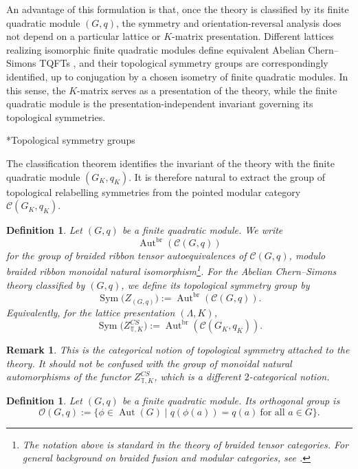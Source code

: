 \documentclass[12pt]{amsart}
\makeatletter
\renewcommand\subsection{\@startsection{subsection}{2}%
  \z@{.5\linespacing\@plus.7\linespacing}{-.5em}%
  {\normalfont\bfseries}}
\numberwithin{equation}{section}
\newtheorem{definition}[theorem]{Definition}
\newtheorem*{remark}{Remark}
\theoremstyle{definition}
\DeclareMathOperator{\Aut}{Aut}
\DeclareMathOperator{\Sym}{Sym}
\makeatother
\begin{document}
An advantage of this formulation is that, once the theory is classified by its finite quadratic module $(G,q)$, the symmetry and orientation-reversal analysis does not depend on a particular lattice or $K$-matrix presentation. Different lattices realizing isomorphic finite quadratic modules define equivalent  Abelian Chern--Simons TQFTs \cite{Galviz4}, and their topological symmetry groups are correspondingly identified, up to conjugation by a chosen isometry of finite quadratic modules. In this sense, the $K$-matrix serves as a presentation of the theory, while the finite quadratic module is the presentation-independent invariant governing its topological symmetries.


\subsection*{Topological symmetry groups}

The classification theorem identifies the invariant of the theory with the finite quadratic module $(G_K,q_K)$.  It is therefore natural to extract the  group of topological relabelling symmetries from the pointed modular category $\mathcal C(G_K,q_K)$.
\begin{definition}
Let $(G,q)$ be a finite quadratic module.  We write
$$
\operatorname{Aut}^{\mathrm{br}}(\mathcal C(G,q))
$$
for the group of braided ribbon tensor autoequivalences of $\mathcal C(G,q)$, modulo braided ribbon monoidal natural isomorphism\footnote{The notation above is standard in the theory of braided tensor categories. For general background on braided fusion and modular categories, see \cite{DGNO2010,Joyal-Street}.}. For the Abelian Chern--Simons theory classified by $(G,q)$, we define its \emph{topological symmetry group} by
$$
\Sym\!\bigl(Z_{(G,q)}\bigr):=
\operatorname{Aut}^{\mathrm{br}}(\mathcal C(G,q)).
$$
Equivalently, for the lattice presentation $(\Lambda,K)$,
$$
\Sym\!\bigl(Z^{CS}_{\mathbb T,K}\bigr):=
\operatorname{Aut}^{\mathrm{br}}(\mathcal C(G_K,q_K)).
$$
\end{definition}

\begin{remark}
This is the  categorical notion of topological symmetry attached to the theory. It should not be confused with the group of monoidal natural automorphisms of the functor $Z^{CS}_{\mathbb T,K}$, which is a different $2$-categorical notion.
\end{remark}

\begin{definition}
Let $(G,q)$ be a finite quadratic module.  Its orthogonal group is
$$
\mathcal O(G,q):=\{\phi\in \Aut(G)\mid q(\phi(a))=q(a)\ \text{for all }a\in G\}.
$$
\end{definition}
\end{document}
